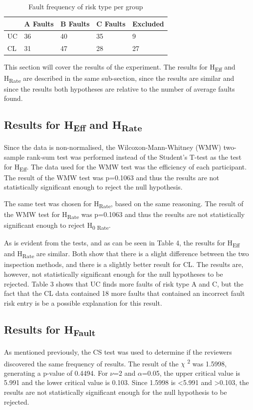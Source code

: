 \documentclass[10pt,twocolumn]{article}
\begin{document}
\begin{table}
	\centering
	\begin{tabular}[ht]{| l | l | l | l | l |}
	\hline
	 & A Faults & B Faults & C Faults & Excluded\\
	\hline
	UC & 36 & 40 & 35 & 9\\
	\hline
	CL & 31 & 47 & 28 & 27\\
	\hline
	\end{tabular}
	\caption{Fault frequency of risk type per group}
\end{table}

This section will cover the results of the experiment. The results for H\textsubscript{Eff} and H\textsubscript{Rate} are described in the same sub-section, since the results are similar and since the results both hypotheses are relative to the number of average faults found. 

\subsection{Results for H\textsubscript{Eff} and H\textsubscript{Rate}}
Since the data is non-normalised, the Wilcoxon-Mann-Whitney (WMW) two-sample rank-sum test was performed instead of the Student's T-test as the test for H\textsubscript{Eff}. The data used for the WMW test was the efficiency of each participant. The result of the WMW test was p=0.1063 and thus the results are not statistically significant enough to reject the null hypothesis.  

The same test was chosen for H\textsubscript{Rate}, based on the same reasoning. The result of the WMW test for H\textsubscript{Rate} was p=0.1063 and thus the results are not statistically significant enough to reject H\textsubscript{0 Rate}.  

As is evident from the tests, and as can be seen in Table 4, the results for H\textsubscript{Eff} and H\textsubscript{Rate} are similar. Both show that there is a slight difference between the two inspection methods, and there is a slightly better result for CL. The results are, however, not statistically significant enough for the null hypotheses to be rejected. Table 3 shows that UC finds more faults of risk type A and C, but the fact that the CL data contained 18 more faults that contained an incorrect fault risk entry is be a possible explanation for this result. 


\subsection{Results for H\textsubscript{Fault}}
As mentioned previously, the CS test was used to determine if the reviewers discovered the same frequency of results. The result of the $\chi $ \textsuperscript{2} was 1.5998, generating a p-value of 0.4494. For $\nu$=2 and $\alpha$=0.05, the upper critical value is 5.991 and the lower critical value is 0.103. Since 1.5998 is \textless 5.991 and \textgreater 0.103, the results are not statistically significant enough for the null hypothesis to be rejected. 
\end{document}
